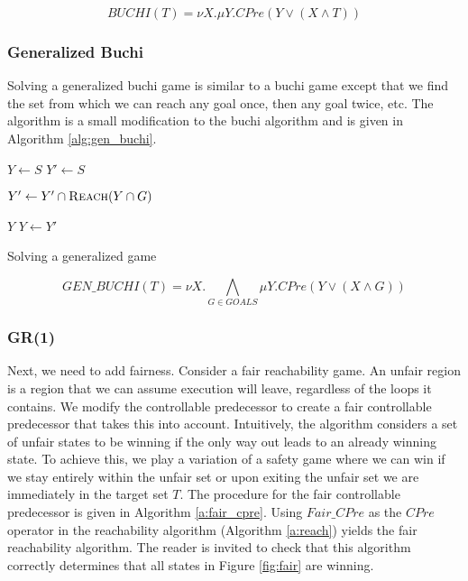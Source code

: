 \begin{equation}
    \mathit{BUCHI}(T) = \nu X. \mu Y. CPre(Y \vee (X \wedge T))
\label{eqn:mu_buchi}
\end{equation}

\subsubsection{Generalized Buchi}

Solving a generalized buchi game is similar to a buchi game except that we find the set from which we can reach any goal once, then any goal twice, etc. The algorithm is a small modification to the buchi algorithm and is given in Algorithm \ref{alg:gen_buchi}.

\begin{algorithm}[t]
\begin{algorithmic}
\State $Y \gets S$
\Loop
\State $Y' \gets S$

\State $Y' \gets Y' \cap \Call{Reach}{Y \cap G}$
\EndFor

\State\Return $Y$\EndIf
\State $Y \gets Y'$

\EndLoop
\EndFunction
\end{algorithmic}
\caption{Solving a generalized \buchi game}
\label{alg:gen_buchi}
\end{algorithm}

\begin{equation}
    \mathit{GEN\_BUCHI}(T) = \nu X. \bigwedge_{G \in GOALS} \mu Y. CPre(Y \vee (X \wedge G))
\label{eqn:mu_buchi}
\end{equation}

\subsubsection{GR(1)}

Next, we need to add fairness. Consider a fair reachability game. An unfair region is a region that we can assume execution will leave, regardless of the loops it contains. We modify the controllable predecessor to create a fair controllable predecessor that takes this into account. Intuitively, the algorithm considers a set of unfair states to be winning if the only way out leads to an already winning state. To achieve this, we play a variation of a safety game where we can win if we stay entirely within the unfair set or upon exiting the unfair set we are immediately in the target set $T$. The procedure for the fair controllable predecessor is given in Algorithm \ref{a:fair_cpre}. Using $Fair\_CPre$ as the $CPre$ operator in the reachability algorithm (Algorithm \ref{a:reach}) yields the fair reachability algorithm. The reader is invited to check that this algorithm correctly determines that all states in Figure \ref{fig:fair} are winning.

